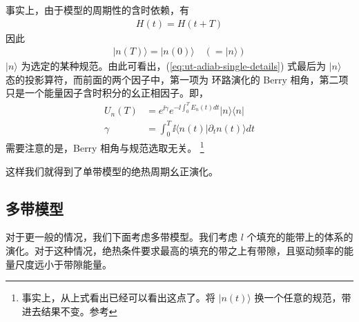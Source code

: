 事实上，由于模型的周期性的含时依赖，有
\begin{align}
H(t) = H(t+T)
\end{align}
因此
\begin{align}
|n(T)\rangle=|n(0)\rangle \quad (=|n\rangle)
\end{align}
$|n\rangle$ 为选定的某种规范。由此可看出，(\ref{eq:ut-adiab-single-details}) 式最后为 $|n\rangle$ 态的投影算符，而前面的两个因子中，第一项为 环路演化的 Berry 相角\cite{niu2010}，第二项只是一个能量因子含时积分的幺正相因子。即，
\begin{align}
U_n(T) &= e^{\ii\gamma}e^{-\ii\int_0^TE_n(t)dt}|n\rangle\langle n|\\
\gamma &=\int_0^T\ii\langle n(t)|\partial_tn(t)\rangle dt
\end{align}
需要注意的是，Berry 相角与规范选取无关。
\footnote{事实上，从上式看出已经可以看出这点了。将 $|n(t)\rangle$ 换一个任意的规范，带进去结果不变。参考}

这样我们就得到了单带模型的绝热周期幺正演化。



\subsection{多带模型}\label{sec:adiab:multi}

对于更一般的情况，我们下面考虑多带模型。我们考虑 $l$ 个填充的能带上的体系的演化。对于这种情况，绝热条件要求最高的填充的带之上有带隙，且驱动频率的能量尺度远小于带隙能量。

